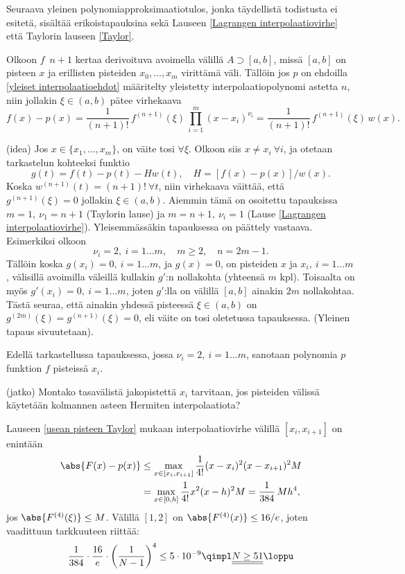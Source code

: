 Seuraava yleinen polynomiapproksimaatiotulos, jonka täydellistä todistusta ei esitetä,
sisältää erikoistapauksina sekä Lauseen \ref{Lagrangen interpolaatiovirhe} että Taylorin
lauseen \ref{Taylor}.
\begin{Lause} \label{usean pisteen Taylor}  
Olkoon $f\,$ $n+1$ kertaa derivoituva avoimella välillä $A\supset[a,b]$, missä $[a,b]$ on
pisteen $x$ ja erillisten pisteiden $x_0,\ldots,x_m$ virittämä väli. Tällöin jos $p$ on
ehdoilla \eqref{yleiset interpolaatioehdot} määritelty yleistetty interpolaatiopolynomi
astetta $n$, niin jollakin $\xi \in (a,b)$ pätee virhekaava
\[
f(x)-p(x) = \frac{1}{(n+1)!}\,f^{(n+1)}(\xi)\,\prod_{i=1}^m (x-x_i)^{\nu_i} 
          = \frac{1}{(n+1)!}\,f^{(n+1)}(\xi)\,w(x).
\]
\end{Lause}
\tod (idea) Jos $x \in \{x_1,\ldots, x_m\}$, on väite tosi $\forall\xi$. Olkoon siis 
$x \neq x_i\ \forall i$, ja otetaan tarkastelun kohteeksi funktio 
\[
g(t)=f(t)-p(t)- Hw(t),\quad H=[f(x)-p(x)]/w(x).
\]
Koska $w^{(n+1)}(t)=(n+1)!\ \forall t$, niin virhekaava väittää, että $g^{(n+1)}(\xi)=0$ 
jollakin $\xi \in (a,b)$. Aiemmin tämä on osoitettu tapauksissa $m=1,\ \nu_1=n+1$ 
(Taylorin lause) ja $m=n+1,\ \nu_i=1$ (Lause \ref{Lagrangen interpolaatiovirhe}). 
Yleisemmässäkin tapauksessa on päättely vastaava. Esimerkiksi olkoon 
\[ 
\nu_i=2,\ i=1\ldots m, \quad m \ge 2, \quad n=2m-1. 
\]
Tällöin koska $g(x_i)=0,\ i=1\ldots m$, ja $g(x)=0$, on pisteiden $x$ ja $x_i,\ i=1\ldots m$,
välisillä avoimilla väleillä kullakin $g'$:n nollakohta (yhteensä $m$ kpl). Toisaalta on myös 
$g'(x_i)=0,\ i=1\ldots m$, joten $g'$:lla on välillä $[a,b]$ ainakin $2m$ nollakohtaa. Tästä 
seuraa, että ainakin yhdessä pisteessä $\xi \in (a,b)$ on $g^{(2m)}(\xi)=g^{(n+1)}(\xi)=0$,
eli väite on tosi oletetussa tapauksessa. (Yleinen tapaus sivuutetaan). \loppu

Edellä tarkastellussa tapauksessa, jossa $\nu_i=2,\ i=1\ldots m$, sanotaan polynomia $p$ 
funktion $f$  pisteissä $x_i$.
\setcounter{Exa}{0}
\begin{Exa} (jatko) Montako tasavälistä jakopistettä $x_i$ tarvitaan, jos pisteiden välissä
käytetään kolmannen asteen Hermiten interpolaatiota?
\end{Exa}
\ratk Lauseen \ref{usean pisteen Taylor} mukaan interpolaatiovirhe välillä $[x_i,x_{i+1}]$ on 
enintään
\begin{align*}
\abs{F(x)-p(x)} &\leq \max_{x\in [x_i,x_{i+1}]} \frac{1}{4!} (x-x_i)^2(x-x_{i+1})^2 M \\
                &=    \max_{x\in [0,h]} \frac{1}{4!} x^2(x-h)^2 M = \frac{1}{384}\,Mh^4,
\end{align*}
jos $\abs{F^{(4)}(\xi)}\leq M$. Välillä $[1,2]$ on $\abs{F^{(4)}(x)}\leq 16/e$, joten
vaadittuun tarkkuuteen riittää:
\[
\frac{1}{384}\cdot\frac{16}{e}\cdot\left(\frac{1}{N-1}\right)^4\leq 5\cdot 10^{-9} 
           \qimpl \underline{\underline{N\geq 51}} \loppu
\]

